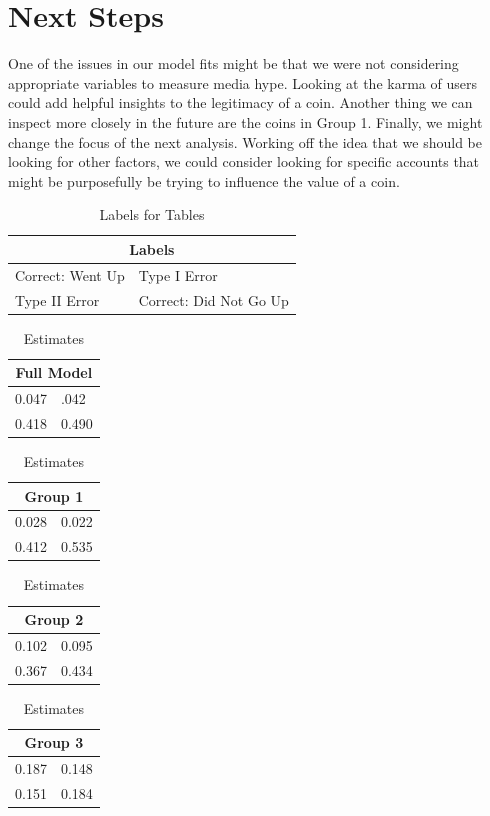 \documentclass[12pt]{article}
\begin{document}
\section{Next Steps}

\indent\indent One of the issues in our model fits might be that we were not considering appropriate variables to measure media hype. Looking at the karma of users could add helpful insights to the legitimacy of a coin. Another thing we can inspect more closely in the future are the coins in Group 1. Finally, we might change the focus of the next analysis. Working off the idea that we should be looking for other factors, we could consider looking for specific accounts that might be purposefully be trying to influence the value of a coin.


\newpage

\begin{table}
\centering
\begin{tabular}{ |p{3cm}|p{3cm}|  }
\hline
\multicolumn{2}{|c|}{Labels} \\
\hline
Correct: Went Up & Type I Error \\
\hline
Type II Error &  Correct: Did Not Go Up \\
\hline
\end{tabular}
\caption{Labels for Tables}
\end{table}


\begin{table}[H]
\begin{tabular}{ |p{3cm}|p{3cm}|  }
\hline
\multicolumn{2}{|c|}{Full Model} \\
\hline
0.047 & .042 \\
\hline
0.418 &  0.490 \\
\hline
\end{tabular}
\quad
\begin{tabular}{ |p{3cm}|p{3cm}|  }
\hline
\multicolumn{2}{|c|}{Group 1} \\
\hline
0.028 & 0.022 \\
\hline
0.412 &  0.535 \\
\hline
\end{tabular}
\quad
\begin{tabular}{ |p{3cm}|p{3cm}|  }
\hline
\multicolumn{2}{|c|}{Group 2} \\
\hline
0.102 & 0.095 \\
\hline
0.367 &  0.434 \\
\hline
\end{tabular}
\quad
\begin{tabular}{ |p{3cm}|p{3cm}|  }
\hline
\multicolumn{2}{|c|}{Group 3} \\
\hline
0.187 & 0.148 \\
\hline
0.151 &  0.184 \\
\hline

\end{tabular}
\caption{Estimates}
\end{table}
\end{document}
